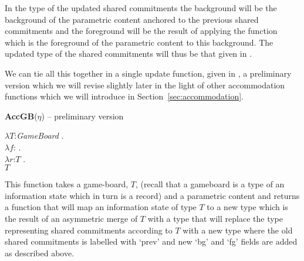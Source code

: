 In the type of the updated shared
commitments the background will be the background of the parametric
content anchored to the previous shared commitments and the foreground
will be the result of applying the function which is the foreground of
the parametric content to this background.
The updated type of the shared commitments
will thus be that given in \nexteg{}.   
\begin{ex} 
\end{ex} 
We can tie all this together in a single update function, given in
\nexteg{}, a preliminary version which we will revise slightly later
in the light of other accommodation functions which we will introduce
in Section~\ref{sec:accommodation}.
\begin{ex} 
\textbf{AccGB}($\eta$) -- preliminary version

$\lambda T$:\textit{GameBoard} . \\
\hspace*{1em} $\lambda
f$:
              . \\
\hspace*{2em} $\lambda r$:$T$ . \\ 
\hspace*{3em} $T$ \fbox{\d{$\wedge$}} 
\label{ex:AccGBprelim} 
\end{ex} 
This function takes a game-board, $T$, (recall that a gameboard is a type of
an information state which in turn is a record) and a parametric
content and returns a function that will map an information state of
type $T$ to a new type which is the result of an asymmetric merge of
$T$ with a type that will replace the type representing shared
commitments according to $T$ with a new type where the old shared
commitments is labelled with `prev'  and new `bg' and `fg' fields are
added as described above.

